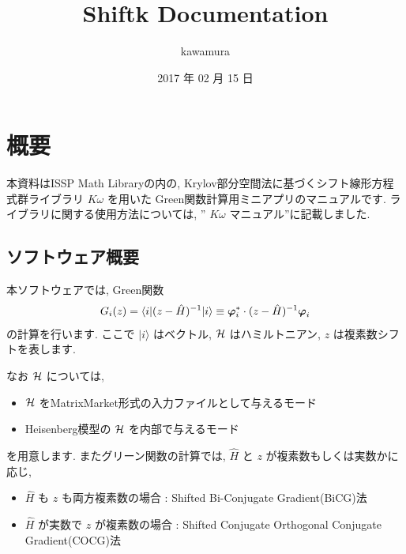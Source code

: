 \documentclass[letterpaper,10pt,dvipdfmx,openany]{sphinxmanual}
\title{Shiftk Documentation}
\date{2017 年 02 月 15 日}
\author{kawamura}
\begin{document}
\maketitle
\tableofcontents
{}\label{index::doc}



\chapter{概要}
\label{shiftk_overview_ja:welcome-to-sample-program-s-documentation}\label{shiftk_overview_ja::doc}\label{shiftk_overview_ja:id1}
本資料はISSP Math
Libraryの内の, Krylov部分空間法に基づくシフト線形方程式群ライブラリ
\(K\omega\) を用いた Green関数計算用ミニアプリのマニュアルです.
ライブラリに関する使用方法については, '' \(K\omega\) マニュアル''に記載しました.


\section{ソフトウェア概要}
\label{shiftk_overview_ja:id2}
本ソフトウェアでは, Green関数
\begin{gather}
\begin{split}\begin{align}
G_{i}(z) =
\langle i | (z-{\hat H})^{-1}| i \rangle
\equiv
{\boldsymbol \varphi}_i^{*} \cdot (z-{\hat H})^{-1} {\boldsymbol \varphi}_i
\end{align}\end{split}\notag
\end{gather}
の計算を行います.
ここで \(| i \rangle\) はベクトル, \({\cal H}\) はハミルトニアン,
\(z\) は複素数シフトを表します.

なお \({\cal H}\) については,
\begin{itemize}
\item {} 
\({\cal H}\) をMatrixMarket形式の入力ファイルとして与えるモード

\item {} 
Heisenberg模型の \({\cal H}\) を内部で与えるモード

\end{itemize}

を用意します.
またグリーン関数の計算では, \({\hat H}\) と \(z\) が複素数もしくは実数かに応じ,
\begin{itemize}
\item {} 
\({\hat H}\) も \(z\) も両方複素数の場合 : Shifted
Bi-Conjugate Gradient(BiCG)法

\item {} 
\({\hat H}\) が実数で \(z\) が複素数の場合 : Shifted
Conjugate Orthogonal Conjugate Gradient(COCG)法

\end{itemize}
\end{document}
